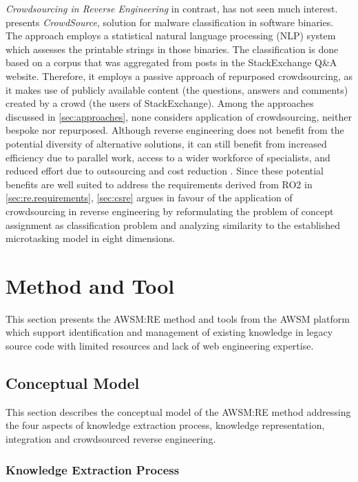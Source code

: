 \emph{Crowdsourcing in Reverse Engineering} in contrast, has not seen much interest.
\autocite{Saxe2014} presents \emph{CrowdSource}, solution for malware classification in software binaries.
The approach employs a statistical natural language processing (NLP) system which assesses the printable strings in those binaries.
The classification is done based on a corpus that was aggregated from posts in the StackExchange Q\&A website.
Therefore, it employs a passive approach of repurposed crowdsourcing, as it makes use of publicly available content (the questions, answers and comments) created by a crowd (the users of StackExchange).
Among the approaches discussed in \cref{sec:approaches}, none considers application of crowdsourcing, neither bespoke nor repurposed.
Although reverse engineering does not benefit from the potential diversity of alternative solutions, it can still benefit from increased efficiency due to parallel work, access to a wider workforce of specialists, \autocite{Latoza2016} and reduced effort due to outsourcing and cost reduction \autocite{Stol2014}.
Since these potential benefits are well suited to address the requirements derived from RO2 in \cref{sec:re.requirements}, \cref{sec:csre} argues in favour of the application of crowdsourcing in reverse engineering by reformulating the problem of concept assignment as classification problem and analyzing similarity to the established microtasking model in eight dimensions.

\hypertarget{method-and-tool}{%
\section{Method and Tool}\label{method-and-tool}}

This section presents the AWSM:RE method and tools from the AWSM platform which support identification and management of existing knowledge in legacy source code with limited resources and lack of web engineering expertise.

\hypertarget{conceptual-model}{%
\subsection{Conceptual Model}\label{conceptual-model}}

This section describes the conceptual model of the AWSM:RE method addressing the four aspects of knowledge extraction process, knowledge representation, integration and crowdsourced reverse engineering.

\hypertarget{sec:re.conceptual.process}{%
\subsubsection{Knowledge Extraction Process}\label{sec:re.conceptual.process}}

